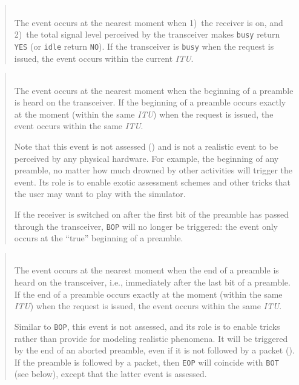\begin{quote}
\noindent{}\\ \hspace{0in}
The event occurs at the nearest moment when 1)~the receiver is on, and 2)~the
total signal level perceived by the transceiver makes {\tt busy} return
{\tt YES} (or {\tt idle} return {\tt NO}).
If the transceiver is {\tt busy} when the request is issued,
the event occurs within the current {\em ITU}.
\end{quote}

\begin{quote}
\noindent{}\\ \hspace{0in}
The event occurs at the nearest moment when the beginning of a preamble
is heard on the transceiver.
If the beginning of a preamble occurs exactly at the moment (within the
same {\em ITU\/}) when the request is issued, the event occurs within the
same {\em ITU}.

\medskip
Note that this event is not assessed () and is not a
realistic event to be perceived by any physical hardware.
For example, the beginning of any preamble, no matter how much
drowned by other activities will trigger the event.
Its role is to enable exotic assessment schemes and other tricks that the
user may want to play with the simulator.

\noindent
If the receiver is switched on after the first bit of the preamble has
passed through the transceiver, {\tt BOP} will no longer be triggered:
the event only occurs at the ``true'' beginning of a preamble.
\end{quote}

\begin{quote}
\noindent{}\\ \hspace{0in}
The event occurs at the nearest moment when the end of a preamble
is heard on the transceiver, i.e., immediately after the last bit
of a preamble.
If the end of a preamble occurs exactly at the moment (within the
same {\em ITU\/}) when the request is issued, the event occurs within the
same {\em ITU}.

\medskip
Similar to {\tt BOP}, this event is not assessed, and its role is to
enable tricks rather than provide for modeling realistic phenomena.
It will be triggered by the end of an aborted preamble,
even if it is not followed by a packet ().
If the preamble is followed by a packet, then {\tt EOP} will coincide with
{\tt BOT} (see below), except that the latter event is assessed.
\end{quote}

